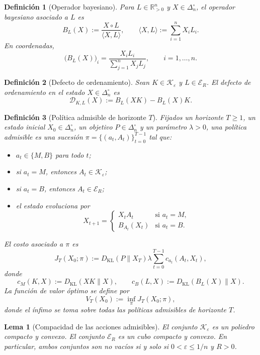 \documentclass[12pt]{article}
\newtheorem{definicion}{Definición}[section]
\newtheorem{lema}{Lema}[section]
\begin{document}
\begin{definicion}[Operador bayesiano]
Para $L\in\mathbb{R}_{>0}^n$ y $X\in\Delta_n^\circ$, el \emph{operador bayesiano}
asociado a $L$ es
\[
B_L(X):=\frac{X\circ L}{\langle X,L\rangle},
\qquad
\langle X,L\rangle:=\sum_{i=1}^n X_iL_i.
\]
En coordenadas,
\[
\bigl(B_L(X)\bigr)_i=\frac{X_iL_i}{\sum_{j=1}^n X_jL_j},
\qquad i=1,\dots,n.
\]
\end{definicion}

\begin{definicion}[Defecto de ordenamiento]
Sean $K\in\mathcal{K}_\varepsilon$ y $L\in\mathcal{E}_R$. El \emph{defecto de
ordenamiento} en el estado $X\in\Delta_n^\circ$ es
\[
\mathcal{D}_{K,L}(X):=B_L(XK)-B_L(X)K.
\]
\end{definicion}

\begin{definicion}[Política admisible de horizonte $T$]
Fijados un horizonte $T\geq 1$, un estado inicial $X_0\in\Delta_n^\circ$, un
objetivo $P\in\Delta_n^\circ$ y un parámetro $\lambda>0$, una \emph{política
admisible} es una sucesión $\pi=\{(a_t,A_t)\}_{t=0}^{T-1}$ tal que:
\begin{itemize}[nosep]
  \item $a_t\in\{M,B\}$ para todo $t$;
  \item si $a_t=M$, entonces $A_t\in\mathcal{K}_\varepsilon$;
  \item si $a_t=B$, entonces $A_t\in\mathcal{E}_R$;
  \item el estado evoluciona por
  \[
  X_{t+1}=
  \begin{cases}
  X_tA_t & \text{si } a_t=M,\\[0.2em]
  B_{A_t}(X_t) & \text{si } a_t=B.
  \end{cases}
  \]
\end{itemize}
El costo asociado a $\pi$ es
\[
J_T(X_0;\pi)
:=
D_{\mathrm{KL}}(P\|X_T)
\lambda\sum_{t=0}^{T-1} c_{a_t}(A_t,X_t),
\]
donde
\[
c_M(K,X):=D_{\mathrm{KL}}(XK\|X),
\qquad
c_B(L,X):=D_{\mathrm{KL}}(B_L(X)\|X).
\]
La función de valor óptimo se define por
\[
V_T(X_0):=\inf_{\pi}J_T(X_0;\pi),
\]
donde el ínfimo se toma sobre todas las políticas admisibles de horizonte $T$.
\end{definicion}

\begin{lema}[Compacidad de las acciones admisibles]
El conjunto $\mathcal{K}_\varepsilon$ es un poliedro compacto y convexo. El
conjunto $\mathcal{E}_R$ es un cubo compacto y convexo. En particular, ambos
conjuntos son no vacíos si y solo si $0<\varepsilon\leq 1/n$ y $R>0$.
\end{lema}
\end{document}
